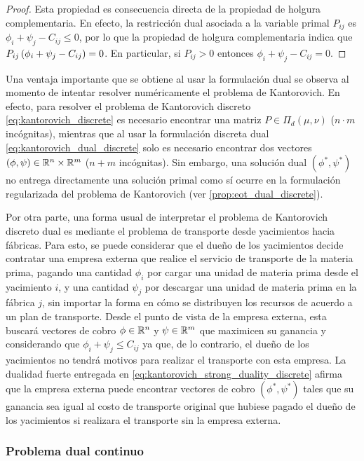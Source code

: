 \begin{proof}
	Esta propiedad es consecuencia directa de la propiedad de holgura complementaria. En efecto, la restricción dual asociada a la variable primal $P_{ij}$ es $\phi_i + \psi_j - C_{ij}\leq 0$, por lo que la propiedad de holgura complementaria indica que $P_{ij}\left(\phi_i + \psi_j - C_{ij}\right) = 0$. En particular, si $P_{ij}>0$ entonces $\phi_i + \psi_j - C_{ij} = 0$.
\end{proof}

Una ventaja importante que se obtiene al usar la formulación dual se observa al momento de intentar resolver numéricamente el problema de Kantorovich. En efecto, para resolver el problema de Kantorovich discreto \eqref{eq:kantorovich_discrete} es necesario encontrar una matriz $P\in\Pi_d(\mu,\nu)$ ($n\cdot m$ incógnitas), mientras que al usar la formulación discreta dual \eqref{eq:kantorovich_dual_discrete} solo es necesario encontrar dos vectores $(\phi,\psi)\in\mathbb{R}^n\times\mathbb{R}^m$ ($n+m$ incógnitas). Sin embargo, una solución dual $(\phi^*,\psi^*)$ no entrega directamente una solución primal como sí ocurre en la formulación regularizada del problema de Kantorovich (ver \autoref{prop:eot_dual_discrete}).

Por otra parte, una forma usual de interpretar el problema de Kantorovich discreto dual es mediante el problema de transporte desde yacimientos hacia fábricas. Para esto, se puede considerar que el dueño de los yacimientos decide contratar una empresa externa que realice el servicio de transporte de la materia prima, pagando una cantidad $\phi_i$ por cargar una unidad de materia prima desde el yacimiento $i$, y una cantidad $\psi_j$ por descargar una unidad de materia prima en la fábrica $j$, sin importar la forma en cómo se distribuyen los recursos de acuerdo a un plan de transporte. Desde el punto de vista de la empresa externa, esta buscará vectores de cobro $\phi\in\mathbb{R}^n$ y $\psi\in\mathbb{R}^m$ que maximicen su ganancia y considerando que $\phi_i+\psi_j\leq C_{ij}$ ya que, de lo contrario, el dueño de los yacimientos no tendrá motivos para realizar el transporte con esta empresa. La dualidad fuerte entregada en \eqref{eq:kantorovich_strong_duality_discrete} afirma que la empresa externa puede encontrar vectores de cobro $(\phi^*,\psi^*)$ tales que su ganancia sea igual al costo de transporte original que hubiese pagado el dueño de los yacimientos si realizara el transporte sin la empresa externa.

\subsubsection{Problema dual continuo}

